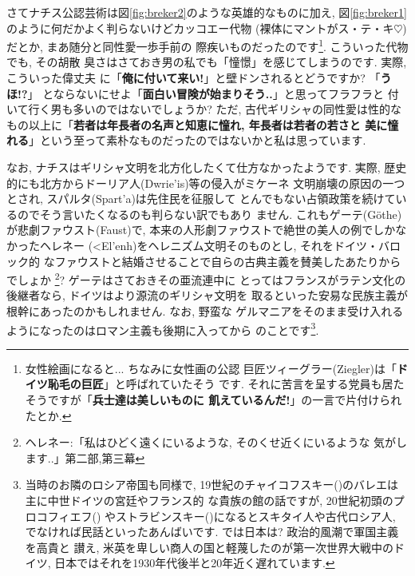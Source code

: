 \documentclass[b5j,8pt,twocolumn]{ltjsarticle}
\newcommand{\textgreek}[1]{\begingroup\fontencoding{LGR}\selectfont#1\endgroup}
\newcommand{\textgreek}[1]{\begingroup\fontencoding{LGR}\selectfont#1\endgroup}
\begin{document}
さてナチス公認芸術は図\ref{fig:breker2}のような英雄的なものに加え, 図\ref{fig:breker1}のように何だかよく判らないけどカッコエー代物
(裸体にマントがス・テ・キ$\heartsuit$)だとか, まあ随分と同性愛一歩手前の
際疾いものだったのです\footnote{女性絵画になると... ちなみに女性画の公認
巨匠ツィーグラー(Ziegler)は「\textbf{ドイツ恥毛の巨匠}」と呼ばれていたそう
です. それに苦言を呈する党員も居たそうですが「\textbf{兵士達は美しいものに
飢えているんだ!}」の一言で片付けられたとか.}. こういった代物でも, その胡散
臭さはさておき男の私でも「憧憬」を感じてしまうのです. 実際, こういった偉丈夫
に「\textbf{俺に付いて来い!}」と壁ドンされるとどうですか? 「\textbf{うほ!?}」
とならないにせよ「\textbf{面白い冒険が始まりそう..}」と思ってフラフラと
付いて行く男も多いのではないでしょうか? ただ, 古代ギリシャの同性愛は性的な
もの以上に「\textbf{若者は年長者の名声と知恵に憧れ, 年長者は若者の若さと
美に憧れる}」という至って素朴なものだったのではないかと私は思っています.
\newline

なお, ナチスはギリシャ文明を北方化したくて仕方なかったようです. 実際,
 歴史的にも北方からドーリア人(\textgreek{Dwrie'is})等の侵入がミケーネ
文明崩壊の原因の一つとされ, スパルタ(\textgreek{Spart'a})は先住民を征服して
とんでもない占領政策を続けているのでそう言いたくなるのも判らない訳でもあり
ません. これもゲーテ(G\"othe)が悲劇ファウスト(Faust)\cite{ゲーテ}で,
 本来の人形劇ファウストで絶世の美人の例でしかなかったヘレネー
(\textgreek{<El'enh})をヘレニズム文明そのものとし, それをドイツ・バロック的
なファウストと結婚させることで自らの古典主義を賛美したあたりからでしょか
\footnote{ヘレネー:「私はひどく遠くにいるような, そのくせ近くにいるような
気がします..」\cite{ゲーテ}第二部,第三幕}?  ゲーテはさておきその亜流連中に
とってはフランスがラテン文化の後継者なら, ドイツはより源流のギリシャ文明を
取るといった安易な民族主義が根幹にあったのかもしれません. なお, 野蛮な
ゲルマニアをそのまま受け入れるようになったのはロマン主義も後期に入ってから
のことです\footnote{当時のお隣のロシア帝国も同様で, 19世紀のチャイコフスキー({})のバレエは主に中世ドイツの宮廷やフランス的
な貴族の館の話ですが, 20世紀初頭のプロコフィエフ({})
やストラビンスキー({})になるとスキタイ人や古代ロシア人,
 でなければ民話といったあんばいです. では日本は? 政治的風潮で軍国主義を高貴と
讃え, 米英を卑しい商人の国と軽蔑したのが第一次世界大戦中のドイツ\cite{クラウス},
 日本ではそれを1930年代後半と20年近く遅れています.}.
\newline
\end{document}
